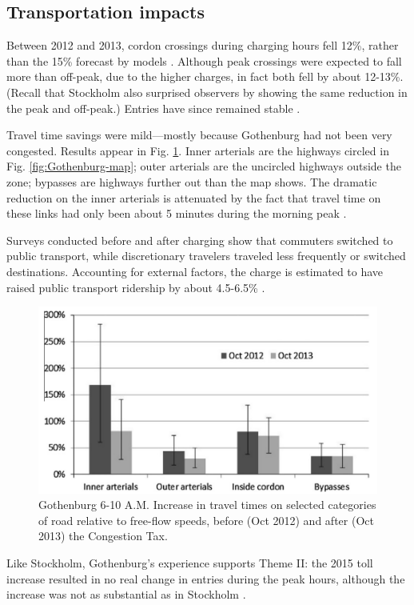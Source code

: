\subsection{Transportation impacts}

Between 2012 and 2013, cordon crossings during charging hours fell 12\%, rather than the 15\% forecast by models \citep{Borjesson2015}. Although peak crossings were expected to fall more than off-peak, due to the higher charges, in fact both fell by about 12-13\%. (Recall that Stockholm also surprised observers by showing the same reduction in the peak and off-peak.) Entries have since remained stable \citet[Tab. 5]{Borjesson2018}.

Travel time savings were mild---mostly because Gothenburg had not been very congested. Results appear in Fig. \ref{fig:Gothenburg-travel-times}. Inner arterials are the highways circled in Fig. \ref{fig:Gothenburg-map}; outer arterials are the uncircled highways outside the zone; bypasses are highways further out than the map shows. The dramatic reduction on the inner arterials is attenuated by the fact that travel time on these links had only been about 5 minutes during the morning peak \citep{Borjesson2015}.

Surveys conducted before and after charging show that commuters switched to public transport, while discretionary travelers traveled less frequently or switched destinations. Accounting for external factors, the charge is estimated to have raised public transport ridership by about 4.5-6.5\% \citep{Borjesson2015}.

\begin{figure}[ht]
\includegraphics[width=0.55\columnwidth]{../img/gburg-travel-times.png}

\caption{Gothenburg 6-10 A.M. Increase in travel times on selected categories of road relative to free-flow speeds, before (Oct 2012) and after (Oct 2013) the Congestion Tax. \citep{Borjesson2015} \label{fig:Gothenburg-travel-times}}

\end{figure}

Like Stockholm, Gothenburg's experience supports Theme II: the 2015 toll increase resulted in no real change in entries during the peak hours, although the increase was not as substantial as in Stockholm \citep[p. 43, Tab. 6]{Borjesson2018}.

